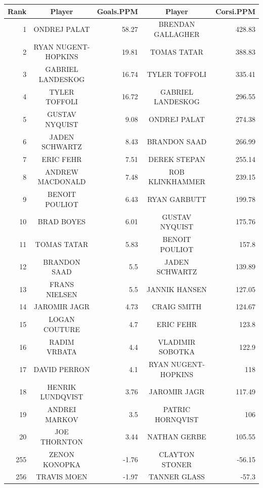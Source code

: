 \begin{table}[p]
    \centering\small
    \begin{tabular}{r c r | c r  }
        Rank & Player & Goals.PPM  & Player & Corsi.PPM  \\ 
        \hline\rule{0pt}{4ex} 
        1     & ONDREJ PALAT & 58.27 & BRENDAN GALLAGHER & 428.83 \\
        2     & RYAN NUGENT-HOPKINS & 19.81 & TOMAS TATAR & 388.83 \\
        3     & GABRIEL LANDESKOG & 16.74 & TYLER TOFFOLI & 335.41 \\
        4     & TYLER TOFFOLI & 16.72 & GABRIEL LANDESKOG & 296.55 \\
        5     & GUSTAV NYQUIST & 9.08  & ONDREJ PALAT & 274.38 \\
        6     & JADEN SCHWARTZ & 8.43  & BRANDON SAAD & 266.99 \\
        7     & ERIC FEHR & 7.51  & DEREK STEPAN & 255.14 \\
        8     & ANDREW MACDONALD & 7.48  & ROB KLINKHAMMER & 239.15 \\
        9     & BENOIT POULIOT & 6.43  & RYAN GARBUTT & 199.78 \\
        10    & BRAD BOYES & 6.01  & GUSTAV NYQUIST & 175.76 \\
        11    & TOMAS TATAR & 5.83  & BENOIT POULIOT & 157.8 \\
        12    & BRANDON SAAD & 5.5   & JADEN SCHWARTZ & 139.89 \\
        13    & FRANS NIELSEN & 5.5   & JANNIK HANSEN & 127.05 \\
        14    & JAROMIR JAGR & 4.73  & CRAIG SMITH & 124.67 \\
        15    & LOGAN COUTURE & 4.7   & ERIC FEHR & 123.8 \\
        16    & RADIM VRBATA & 4.4   & VLADIMIR SOBOTKA & 122.9 \\
        17    & DAVID PERRON & 4.1   & RYAN NUGENT-HOPKINS & 118 \\
        18    & HENRIK LUNDQVIST & 3.76  & JAROMIR JAGR & 117.49 \\
        19    & ANDREI MARKOV & 3.5   & PATRIC HORNQVIST & 106 \\
        20    & JOE THORNTON & 3.44  & NATHAN GERBE & 105.55 \\
        \hline\rule{0pt}{4ex} 
        255   & ZENON KONOPKA & -1.76 & CLAYTON STONER & -56.15 \\
        256   & TRAVIS MOEN & -1.97 & TANNER GLASS & -57.3 \\

\end{tabular}
\end{table}
